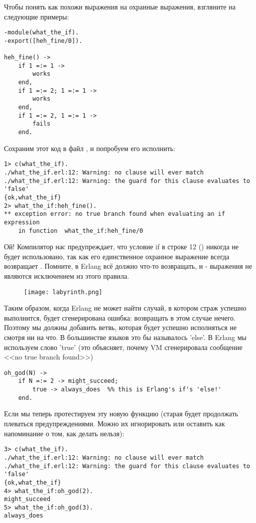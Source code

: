 Чтобы понять как похожи выражения  на охранные выражения, взгляните на следующие примеры:
\begin{lstlisting}[style=erlang]
-module(what_the_if).
-export([heh_fine/0]).
 
heh_fine() ->
    if 1 =:= 1 ->
        works
    end,
    if 1 =:= 2; 1 =:= 1 ->
        works
    end,
    if 1 =:= 2, 1 =:= 1 ->
        fails
    end.
\end{lstlisting}
Сохраним этот код в файл , и попробуем его исполнить:
\begin{lstlisting}[style=repl]
1> c(what_the_if).
./what_the_if.erl:12: Warning: no clause will ever match
./what_the_if.erl:12: Warning: the guard for this clause evaluates to 'false'
{ok,what_the_if}
2> what_the_if:heh_fine().
** exception error: no true branch found when evaluating an if expression
    in function  what_the_if:heh_fine/0
\end{lstlisting}
Ой!
Компилятор нас предупреждает, что условие if в строке 12 () никогда не будет использовано, так как его единственное охранное выражение всегда возвращает .
Помните, в Erlang всё должно что\--то возвращать, и \-- выражения не являются исключением из этого правила. 
\begin{figure}[h!]
    \texttt{[image: labyrinth.png]}
\end{figure}
Таким образом, когда Erlang не может найти случай, в котором страж успешно выполнится, будет сгенерирована ошибка: возвращать в этом случае нечего.
Поэтому мы должны добавить ветвь, которая будет успешно исполняться не смотря ни на что.
В большинстве языков это бы называлось 'else'.
В Erlang мы используем слово 'true' (это объясняет, почему VM сгенерировала сообщение <<no true branch found>>)
\begin{lstlisting}[style=erlang]
oh_god(N) ->
    if N =:= 2 -> might_succeed;
        true -> always_does  %% this is Erlang's if's 'else!'
    end.
\end{lstlisting}

Если мы теперь протестируем эту новую функцию (старая будет продолжать плеваться предупреждениями.
Можно их игнорировать или оставить как напоминание о том, как делать нельзя):
\begin{lstlisting}[style=erlang]
3> c(what_the_if).
./what_the_if.erl:12: Warning: no clause will ever match
./what_the_if.erl:12: Warning: the guard for this clause evaluates to 'false'
{ok,what_the_if}
4> what_the_if:oh_god(2).
might_succeed
5> what_the_if:oh_god(3).
always_does
\end{lstlisting}

